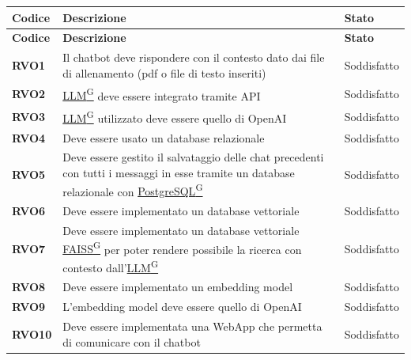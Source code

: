 \begin{longtable}{|>{\centering\arraybackslash}m{}|>{\centering\arraybackslash}m{}|>{\centering\arraybackslash}m{}|}
	\hline
	\textbf{Codice} & \textbf{Descrizione} & \textbf{Stato}\\\hline
	\endfirsthead
	\hline
	\textbf{Codice} & \textbf{Descrizione} & \textbf{Stato}\\\hline
	\endhead
    \hline
    \textbf{RVO1} & Il chatbot deve rispondere con il contesto dato dai file di allenamento (pdf o file di testo inseriti) & Soddisfatto \\
    \hline
    \textbf{RVO2} & \href{https://code7crusaders.github.io/docs/PB/documentazione_interna/glossario.html#llm-large-language-model}{LLM\textsuperscript{G}} deve essere integrato tramite API & Soddisfatto \\
    \hline
    \textbf{RVO3} & \href{https://code7crusaders.github.io/docs/PB/documentazione_interna/glossario.html#llm-large-language-model}{LLM\textsuperscript{G}} utilizzato deve essere quello di OpenAI & Soddisfatto \\
    \hline
    \textbf{RVO4} & Deve essere usato un database relazionale & Soddisfatto \\
    \hline
    \textbf{RVO5} & Deve essere gestito il salvataggio delle chat precedenti con tutti i messaggi in esse tramite un database relazionale con \href{https://code7crusaders.github.io/docs/PB/documentazione_interna/glossario.html#postgresql}{PostgreSQL\textsuperscript{G}} & Soddisfatto \\
    \hline
    \textbf{RVO6} & Deve essere implementato un database vettoriale & Soddisfatto \\
    \hline
    \textbf{RVO7} & Deve essere implementato un database vettoriale \href{https://code7crusaders.github.io/docs/PB/documentazione_interna/glossario.html#faiss}{FAISS\textsuperscript{G}} per poter rendere possibile la ricerca con contesto dall'\href{https://code7crusaders.github.io/docs/PB/documentazione_interna/glossario.html#llm-large-language-model}{LLM\textsuperscript{G}} & Soddisfatto \\
    \hline
    \textbf{RVO8} & Deve essere implementato un embedding model & Soddisfatto \\
    \hline
    \textbf{RVO9} & L'embedding model deve essere quello di OpenAI & Soddisfatto \\
    \hline
    \textbf{RVO10} & Deve essere implementata una WebApp che permetta di comunicare con il chatbot & Soddisfatto \\

\end{longtable}
